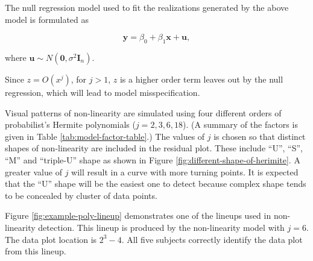 \documentclass[]{interact}
\theoremstyle{plain}%
\theoremstyle{definition}
\theoremstyle{remark}
\begin{document}
The null regression model used to fit the realizations generated by the
above model is formulated as

\begin{equation} \label{eq:null-model}
\boldsymbol{y} = \beta_0 + \beta_1 \boldsymbol{x} + \boldsymbol{u},
\end{equation}

\noindent where
\(\boldsymbol{u} \sim N(\boldsymbol{0}, \sigma^2\boldsymbol{I}_n)\).

Since \(z = O(x^j)\), for \(j > 1\), \(z\) is a higher order term leaves
out by the null regression, which will lead to model misspecification.

Visual patterns of non-linearity are simulated using four different
orders of probabilist's Hermite polynomials (\(j = 2, 3, 6, 18\)). (A
summary of the factors is given in Table \ref{tab:model-factor-table}.)
The values of \(j\) is chosen so that distinct shapes of non-linearity
are included in the residual plot. These include ``U'', ``S'', ``M'' and
``triple-U'' shape as shown in Figure
\ref{fig:different-shape-of-herimite}. A greater value of \(j\) will
result in a curve with more turning points. It is expected that the
``U'' shape will be the easiest one to detect because complex shape
tends to be concealed by cluster of data points.

Figure \ref{fig:example-poly-lineup} demonstrates one of the lineups
used in non-linearity detection. This lineup is produced by the
non-linearity model with \(j = 6\). The data plot location is
\(2^3 - 4\). All five subjects correctly identify the data plot from
this lineup.

\begin{table}

\caption{\label{tab:model-factor-table}Levels of the factors used in data collection periods I, II, III.}
\centering
{}
\end{table}
\end{document}
